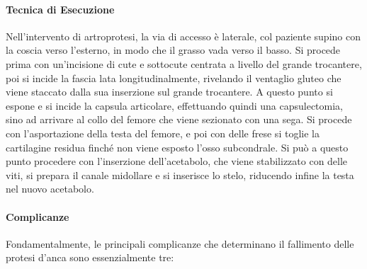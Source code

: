 \paragraph{Tecnica di Esecuzione}


Nell'intervento di artroprotesi, la via di accesso è laterale, col
paziente supino con la coscia verso l'esterno, in modo che il grasso
vada verso il basso. Si procede prima con un'incisione di cute e
sottocute centrata a livello del grande trocantere, poi si incide la
fascia lata longitudinalmente, rivelando il ventaglio gluteo che viene
staccato dalla sua inserzione sul grande trocantere. A questo punto si
espone e si incide la capsula articolare, effettuando quindi una
capsulectomia, sino ad arrivare al collo del femore che viene sezionato
con una sega. Si procede con l'asportazione della testa del femore, e
poi con delle frese si toglie la cartilagine residua finché non viene
esposto l'osso subcondrale. Si può a questo punto procedere con
l'inserzione dell'acetabolo, che viene stabilizzato con delle viti, si
prepara il canale midollare e si inserisce lo stelo, riducendo infine la
testa nel nuovo acetabolo.

\paragraph{Complicanze}


Fondamentalmente, le principali complicanze che determinano il
fallimento delle protesi d'anca sono essenzialmente tre:

